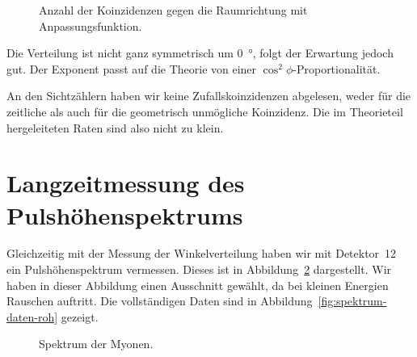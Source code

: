 \documentclass[11pt, ngerman, fleqn, DIV=15, headinclude, BCOR=2cm]{scrreprt}
\begin{document}
\begin{figure}[htbp]
    \centering
    \caption{%
        Anzahl der Koinzidenzen gegen die Raumrichtung mit Anpassungsfunktion.
    }
    \label{fig:winkel-fit}
\end{figure}

Die Verteilung ist nicht ganz symmetrisch um \SI{0}{\degree}, folgt der
Erwartung jedoch gut. Der Exponent passt auf die Theorie von einer
$\cos^2\phi$-Proportionalität.

An den Sichtzählern haben wir keine Zufallskoinzidenzen abgelesen, weder für
die zeitliche als auch für die geometrisch unmögliche Koinzidenz. Die im
Theorieteil hergeleiteten Raten sind also nicht zu klein.

\section{Langzeitmessung des Pulshöhenspektrums}
\label{sec:langzeit_puls}

Gleichzeitig mit der Messung der Winkelverteilung haben wir mit Detektor~12 ein
Pulshöhenspektrum vermessen. Dieses ist in Abbildung~\ref{fig:spektrum-daten}
dargestellt. Wir haben in dieser Abbildung einen Ausschnitt gewählt, da bei
kleinen Energien Rauschen auftritt. Die vollständigen Daten sind in
Abbildung~\ref{fig:spektrum-daten-roh} gezeigt.

\begin{figure}[htbp]
    \centering
    \caption{%
        Spektrum der Myonen.
    }
    \label{fig:spektrum-daten}
\end{figure}
\end{document}
